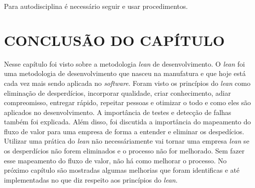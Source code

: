Para autodisciplina é necessário seguir e usar procedimentos.


\section{CONCLUSÃO DO CAPÍTULO}

Nesse capítulo foi visto sobre a metodologia \textit{lean} de desenvolvimento. O \textit{lean} foi uma metodologia de desenvolvimento que nasceu na manufatura e que hoje está cada vez mais sendo aplicada no \textit{software}. Foram visto os princípios do \textit{lean} como eliminação de desperdícios, incorporar qualidade, criar conhecimento, adiar compreomisso, entregar rápido, repeitar pessoas e otimizar o todo e como eles são aplicados no desenvolvimento. A importância de testes e detecção de falhas também foi explicada. Além disso, foi discutida a importância do mapeamento do fluxo de valor para uma empresa de forma a entender e eliminar os despedícios. Utilizar uma prática do \textit{lean} não necessáriamente vai tornar uma empresa \textit{lean} se os desperdícios não forem eliminados e o processo não for melhorado. Sem fazer esse mapeamento do fluxo de valor, não há como melhorar o processo. No próximo capítulo são mostradas algumas melhorias que foram identificas e até implementadas no que diz respeito aos princípios do \textit{lean}. 
